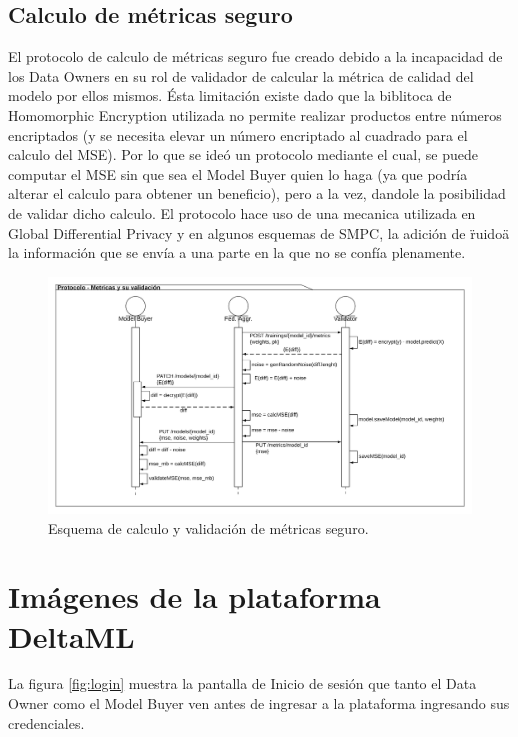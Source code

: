 \documentclass[
11pt, %
oneside, %
spanish, %
singlespacing, %
parskip, %
headsepline, %
chapterinoneline, %
]{MastersDoctoralThesis} %
\begin{document}
\subsection*{Calculo de métricas seguro}

El protocolo de calculo de métricas seguro fue creado debido a la incapacidad de los Data Owners en su rol de validador de calcular la métrica de calidad del modelo por ellos mismos. Ésta limitación existe dado que la biblitoca de Homomorphic Encryption utilizada no permite realizar productos entre números encriptados (y se necesita elevar un número encriptado al cuadrado para el calculo del MSE). Por lo que se ideó un protocolo mediante el cual, se puede computar el MSE sin que sea el Model Buyer quien lo haga (ya que podría alterar el calculo para obtener un beneficio), pero a la vez, dandole la posibilidad de validar dicho calculo.
El protocolo hace uso de una mecanica utilizada en Global Differential Privacy y en algunos esquemas de SMPC, la adición de \"ruido\" a la información que se envía a una parte en la que no se confía plenamente.

\begin{figure}[H]
  	\centering
	\includegraphics[scale=0.1]{imgs/flujo_valid.png}
	\caption{Esquema de calculo y validación de métricas seguro.}
	\label{fig:flujo_valid}
\end{figure}


\section{Imágenes de la plataforma DeltaML}

La figura \ref{fig:login} muestra la pantalla de Inicio de sesión que tanto el Data Owner como el Model Buyer ven antes de ingresar a la plataforma ingresando sus credenciales.
\end{document}
